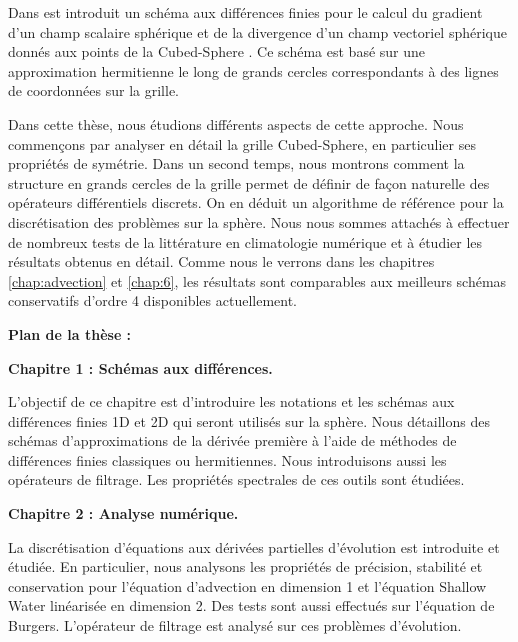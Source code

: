 Dans \cite{Croisille2013,Croisille2015} est introduit un schéma aux différences finies pour le calcul du gradient d'un champ scalaire sphérique et de la divergence d'un champ vectoriel sphérique donnés aux points de la Cubed-Sphere \cite{Sadourny1972}. Ce schéma est basé sur une approximation hermitienne le long de grands cercles correspondants à des lignes de coordonnées sur la grille.

Dans cette thèse, nous étudions différents aspects de cette approche. Nous commençons par analyser en détail la grille Cubed-Sphere, en particulier ses propriétés de symétrie. Dans un second temps, nous montrons comment la structure en grands cercles de la grille permet de définir de façon naturelle des opérateurs différentiels discrets. On en déduit un algorithme de référence pour la discrétisation des problèmes sur la sphère. Nous nous sommes attachés à effectuer de nombreux tests de la littérature en climatologie numérique et à étudier les résultats obtenus en détail. Comme nous le verrons dans les chapitres \ref{chap:advection} et \ref{chap:6}, les résultats sont comparables aux meilleurs schémas conservatifs d'ordre 4 disponibles actuellement.














 


\newpage
\textbf{Plan de la thèse :}

\textbf{Chapitre 1 : Schémas aux différences.}

L'objectif de ce chapitre est d'introduire les notations et les schémas aux différences finies 1D et 2D qui seront utilisés sur la sphère. Nous détaillons des schémas d'approximations de la dérivée première à l'aide de méthodes de différences finies classiques ou hermitiennes. Nous introduisons aussi les opérateurs de filtrage. Les propriétés spectrales de ces outils sont étudiées.







\vspace{0.7cm}
\textbf{Chapitre 2 : Analyse numérique.}

La discrétisation d'équations aux dérivées partielles d'évolution est introduite et étudiée. En particulier, nous analysons les propriétés de précision, stabilité et conservation pour l'équation d'advection en dimension 1 et l'équation Shallow Water linéarisée en dimension 2. Des tests sont aussi effectués sur l'équation de Burgers. L'opérateur de filtrage est analysé sur ces problèmes d'évolution.







